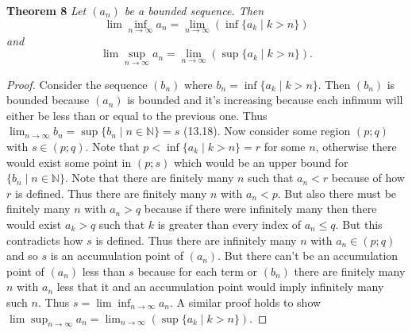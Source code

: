 \documentclass{article}
\begin{document}
\begin{flushleft}
\textbf{Theorem 8}
\textsl{Let $(a_n)$ be a bounded sequence. Then
\[
\lim \inf_{n \rightarrow \infty} a_n = \lim_{n \rightarrow \infty} (\inf \{a_k \mid k > n\})
\]
and
\[
\lim \sup_{n \rightarrow \infty} a_n = \lim_{n \rightarrow \infty} (\sup \{a_k \mid k > n\}).
\]}
\begin{proof}
Consider the sequence $(b_n)$ where $b_n = \inf \{a_k \mid k > n\}$. Then $(b_n)$ is bounded because $(a_n)$ is bounded and it's increasing because each infimum will either be less than or equal to the previous one. Thus $\lim_{n \rightarrow \infty} b_n = \sup \{b_n \mid n \in \mathbb{N}\} = s$ (13.18). Now consider some region $(p;q)$ with $s \in (p;q)$. Note that $p < \inf \{a_k \mid k > n\} = r$ for some $n$, otherwise there would exist some point in $(p;s)$ which would be an upper bound for $\{b_n \mid n \in \mathbb{N}\}$. Note that there are finitely many $n$ such that $a_n < r$ because of how $r$ is defined. Thus there are finitely many $n$ with $a_n < p$. But also there must be finitely many $n$ with $a_n > q$ because if there were infinitely many then there would exist $a_k > q$ such that $k$ is greater than every index of $a_n \leq q$. But this contradicts how $s$ is defined. Thus there are infinitely many $n$ with $a_n \in (p;q)$ and so $s$ is an accumulation point of $(a_n)$. But there can't be an accumulation point of $(a_n)$ less than $s$ because for each term or $(b_n)$ there are finitely many $n$ with $a_n$ less that it and an accumulation point would imply infinitely many such $n$. Thus $s = \lim \inf_{n \rightarrow \infty} a_n$. A similar proof holds to show $\lim \sup_{n \rightarrow \infty} a_n = \lim_{n \rightarrow \infty} (\sup \{a_k \mid k > n\})$.
\end{proof}


\end{flushleft}
\end{document}
